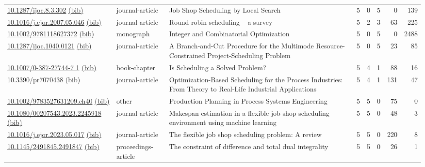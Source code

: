 {\begin{longtable}{p{5cm}lp{11cm}rrrrr}
\href{http://dx.doi.org/10.1287/ijoc.8.3.302}{10.1287/ijoc.8.3.302} \href{https://www.doi2bib.org/bib/10.1287/ijoc.8.3.302}{(bib)} & journal-article & Job Shop Scheduling by Local Search & 5 & 0 & 5 & 0 & 139 \\
\href{http://dx.doi.org/10.1016/j.ejor.2007.05.046}{10.1016/j.ejor.2007.05.046} \href{https://www.doi2bib.org/bib/10.1016/j.ejor.2007.05.046}{(bib)} & journal-article & Round robin scheduling – a survey & 5 & 2 & 3 & 63 & 225 \\
\href{http://dx.doi.org/10.1002/9781118627372}{10.1002/9781118627372} \href{https://www.doi2bib.org/bib/10.1002/9781118627372}{(bib)} & monograph & Integer and Combinatorial Optimization & 5 & 0 & 5 & 0 & 2488 \\
\href{http://dx.doi.org/10.1287/ijoc.1040.0121}{10.1287/ijoc.1040.0121} \href{https://www.doi2bib.org/bib/10.1287/ijoc.1040.0121}{(bib)} & journal-article & A Branch-and-Cut Procedure for the Multimode Resource-Constrained Project-Scheduling Problem & 5 & 0 & 5 & 23 & 85 \\
\href{http://dx.doi.org/10.1007/0-387-27744-7_1}{10.1007/0-387-27744-7 1} \href{https://www.doi2bib.org/bib/10.1007/0-387-27744-7_1}{(bib)} & book-chapter & Is Scheduling a Solved Problem? & 5 & 4 & 1 & 88 & 16 \\
\href{http://dx.doi.org/10.3390/pr7070438}{10.3390/pr7070438} \href{https://www.doi2bib.org/bib/10.3390/pr7070438}{(bib)} & journal-article & Optimization-Based Scheduling for the Process Industries: From Theory to Real-Life Industrial Applications & 5 & 4 & 1 & 131 & 47 \\
\href{http://dx.doi.org/10.1002/9783527631209.ch40}{10.1002/9783527631209.ch40} \href{https://www.doi2bib.org/bib/10.1002/9783527631209.ch40}{(bib)} & other & Production Planning in Process Systems Engineering & 5 & 5 & 0 & 75 & 0 \\
\href{http://dx.doi.org/10.1080/00207543.2023.2245918}{10.1080/00207543.2023.2245918} \href{https://www.doi2bib.org/bib/10.1080/00207543.2023.2245918}{(bib)} & journal-article & Makespan estimation in a flexible job-shop scheduling environment using machine learning & 5 & 5 & 0 & 48 & 3 \\
\href{http://dx.doi.org/10.1016/j.ejor.2023.05.017}{10.1016/j.ejor.2023.05.017} \href{https://www.doi2bib.org/bib/10.1016/j.ejor.2023.05.017}{(bib)} & journal-article & The flexible job shop scheduling problem: A review & 5 & 5 & 0 & 220 & 8 \\
\href{http://dx.doi.org/10.1145/2491845.2491847}{10.1145/2491845.2491847} \href{https://www.doi2bib.org/bib/10.1145/2491845.2491847}{(bib)} & proceedings-article & The constraint of difference and total dual integrality & 5 & 5 & 0 & 26 & 1 \\

\end{longtable}}
